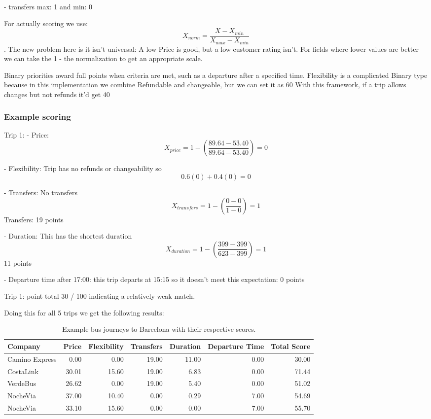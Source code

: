 ﻿\documentclass[11pt]{article}
\begin{document}
- transfers max: 1 and min: 0

For actually scoring we use: $$X_{norm} = \frac{X - X_{min}}{X_{max} - X_{min}}$$. The new problem here is it isn't universal: A low Price is good, but a low customer rating isn't. For fields where lower values are better we can take the 1 - the normalization to get an appropriate scale.

Binary priorities award full points when criteria are met, such as a departure after a specified time.
Flexibility is a complicated Binary type because in this implementation we combine Refundable and changeable, but we can set it as 60%
With this framework, if a trip allows changes but not refunds it'd get 40%

\subsubsection{Example scoring}
Trip 1:
- Price: $$X_{price} = 1 - \left(\frac{89.64 - 53.40}{89.64 - 53.40}\right) = 0$$

- Flexibility: Trip has no refunds or changeability so $$0.6\left( 0 \right) + 0.4\left( 0 \right) = 0$$

- Transfers: No transfers $$X_{transfers} = 1 - \left( \frac{0 - 0}{1 - 0} \right) = 1$$ Transfers: 19 points

- Duration: This has the shortest duration $$X_{duration} = 1 - \left(\frac{399 - 399}{623 - 399} \right) = 1$$ 11 points

- Departure time after 17:00: this trip departs at 15:15 so it doesn't meet this expectation: 0 points

Trip 1: point total 30 / 100 indicating a relatively weak match.

Doing this for all 5 trips we get the following results:
\begin{table}[H]
\centering
\scriptsize
\setlength{\tabcolsep}{3pt}
\begin{tabular}{lrrrrrr}
\toprule
Company & Price & Flexibility & Transfers & Duration & Departure Time & Total Score \\
\midrule
Camino Express & 0.00 & 0.00 & 19.00 & 11.00 & 0.00 & 30.00 \\
CostaLink & 30.01 & 15.60 & 19.00 & 6.83 & 0.00 & 71.44 \\
VerdeBus & 26.62 & 0.00 & 19.00 & 5.40 & 0.00 & 51.02 \\
NocheVia & 37.00 & 10.40 & 0.00 & 0.29 & 7.00 & 54.69 \\
NocheVia & 33.10 & 15.60 & 0.00 & 0.00 & 7.00 & 55.70 \\
\bottomrule
\end{tabular}
\caption{Example bus journeys to Barcelona with their respective scores.}
\label{tab:barcelona-trips-scores}
\end{table}
\end{document}
